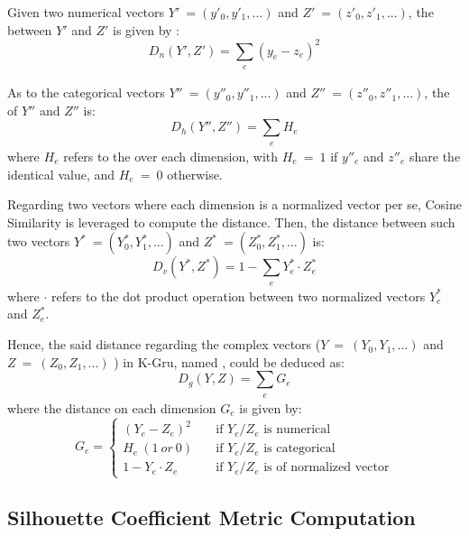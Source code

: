 Given two numerical vectors $Y'\ = (y'_0, y'_1, ...)$ and $Z'\ = (z'_0, z'_1, ...)$, the \od{} \cite{IEEEexample:books/mk/HanKP2011} between $Y'$ and $Z'$ is given by :
%
\begin{equation}
\label{eq:od}
D_n(Y', Z') = \sum_{\substack{e}} (y_e - z_e)^2
\end{equation}

As to the categorical vectors $Y''\ = (y''_0, y''_1, ...)$ and  $Z''\ = (z''_0, z''_1, ...)$, the \hd{} \cite{IEEEexample:huang1997clustering} of $Y''$ and $Z''$ is:
%
\begin{equation}
\label{eq:hd}
D_h(Y'', Z'') = \sum_{\substack{e}} H_e
\end{equation}
where $H_e$ refers to the \hd{} over each dimension, with $H_e\ =\ 1$ if $y''_e$ and $z''_e$ share the identical value, and $H_e\ =\ 0$ otherwise.

Regarding two vectors where each dimension is a normalized vector per se, Cosine Similarity is leveraged to compute the distance.
Then, the distance between such two vectors $Y^{\ast}\ = (Y^{\ast}_0, Y^{\ast}_1, ...)$ and $Z^{\ast}\ = (Z^{\ast}_0, Z^{\ast}_1, ...)$ is:
%
\begin{equation}
\label{eq:vd}
D_v(Y^{\ast}, Z^{\ast}) = 1- \sum_{\substack{e}} Y^{\ast}_e \cdot Z^{\ast}_e
\end{equation}
where $\cdot$ refers to the dot product operation between two normalized vectors $Y^{\ast}_e$ and $Z^{\ast}_e$.

Hence, the said distance regarding the complex vectors ($Y\ =\ (Y_0, Y_1, ...)$ and $Z\ =\ (Z_0, Z_1, ...)$ ) in K-Gru, named \gd{}, could be deduced as:
%
\begin{equation}
\label{eq:gd}
D_g(Y, Z) = \sum_{\substack{e}} G_e
\end{equation}
where the distance on each dimension $G_e$ is given by:
%
\begin{equation}
\label{eq:ge}
G_e =
  \begin{cases}
    (Y_e - Z_e)^2       & \quad \text{if } Y_e/Z_e \text{ is numerical}\\
    H_e\ (1\ or\ 0)       	& \quad \text{if } Y_e/Z_e \text{ is categorical}\\
    1 - Y_e \cdot Z_e  		& \quad \text{if } Y_e/Z_e \text{ is of normalized vector}
  \end{cases}
\end{equation}


\subsection{Silhouette Coefficient Metric Computation}
\label{sec:compu}

